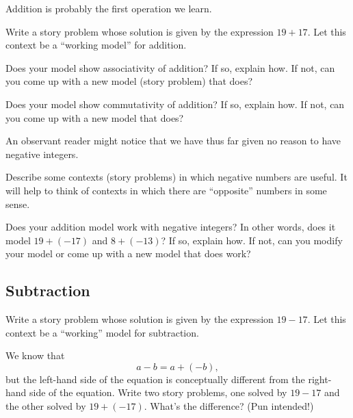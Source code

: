 Addition is probably the first operation we learn.    

\begin{question}
Write a story problem whose solution is given by the expression
$19+17$. Let this context be a ``working model'' for addition.
\end{question}
\QM

\begin{question}
Does your model show associativity of addition? If so, explain how. If
not, can you come up with a new model (story problem) that does?
\end{question}
\QM

\begin{question}
Does your model show commutativity of addition? If so, explain how. If
not, can you come up with a new model that does?
\end{question}
\QM

An observant reader might notice that we have thus far given no reason to have 
negative integers.  

\begin{question}
Describe some contexts (story problems) in which negative numbers are useful.  
It will help to think of contexts in which there are ``opposite'' numbers in some sense.  
\end{question}
\QM

\begin{question}
Does your addition model work with negative integers?  In other words, does it model 
$19+ (-17)$ and $8 + (-13)$?  If so, explain how. If not, can you modify your model or 
come up with a new model that does work?
\end{question}
\QM

\subsection{Subtraction}
\begin{question}
Write a story problem whose solution is given by the expression
$19-17$. Let this context be a ``working'' model for subtraction.  
\end{question}
\QM

\begin{question}
We know that 
\[
a - b  = a + (-b),
\]
but the left-hand side of the equation is conceptually
different from the right-hand side of the equation. Write two story
problems, one solved by $19-17$ and the other solved by
$19+(-17)$. What's the difference? (Pun intended!)
\end{question}
\QM

